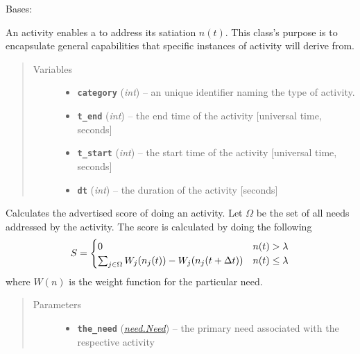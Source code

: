 \documentclass[letterpaper,10pt,english]{sphinxmanual}
\begin{document}
\begin{fulllineitems}
\label{activity:activity.Activity}
Bases: 

An activity enables a {\hyperref[person:person.Person]{\emph{}}} to address its satiation
\(n(t)\). This class's purpose is to encapsulate general
capabilities that specific instances of activity will derive from.
\begin{quote}\begin{description}
\item[{Variables}] \leavevmode\begin{itemize}
\item {} 
\textbf{\texttt{category}} (\emph{int}) -- an unique identifier naming the type of activity.

\item {} 
\textbf{\texttt{t\_end}} (\emph{int}) -- the end time of the activity {[}universal time, seconds{]}

\item {} 
\textbf{\texttt{t\_start}} (\emph{int}) -- the start time of the activity {[}universal time, seconds{]}

\item {} 
\textbf{\texttt{dt}} (\emph{int}) -- the duration of the activity {[}seconds{]}

\end{itemize}

\end{description}\end{quote}

\begin{fulllineitems}
\label{activity:activity.Activity.advertise}
Calculates the advertised score of doing an activity. Let
\(\Omega\) be the set of all needs addressed by the activity.
The score is calculated by doing the following
\begin{gather}
\begin{split}S = \begin{cases}
    0  & n(t) > \lambda \\
    \sum_{j \in \Omega} W_j( n_j(t) ) - W_j( n_j(t + \Delta{t} )) & n(t) \le \lambda
\end{cases}\end{split}\notag
\end{gather}
where \(W(n)\) is the weight function for the particular need.
\begin{quote}\begin{description}
\item[{Parameters}] \leavevmode\begin{itemize}
\item {} 
\textbf{\texttt{the\_need}} ({\hyperref[need:need.Need]{\emph{\emph{need.Need}}}}) -- the primary need associated with the respective activity


\end{itemize}
\end{description}
\end{quote}
\end{fulllineitems}
\end{fulllineitems}
\end{document}
